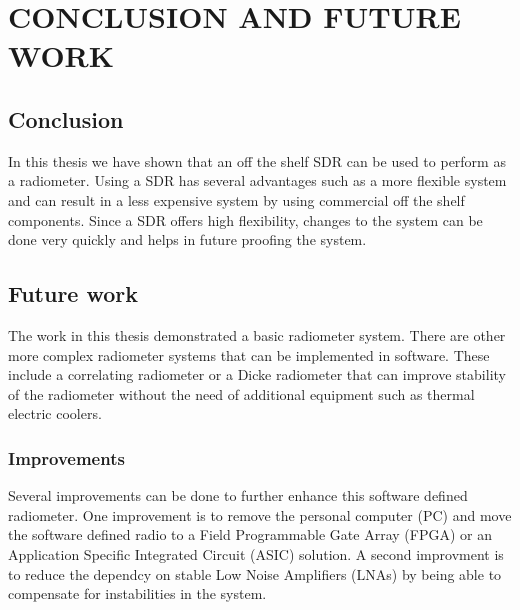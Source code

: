 
\chapter{CONCLUSION AND FUTURE WORK} \label{ch:conclusion}

\section{Conclusion}
In this thesis we have shown that an off the shelf SDR can be used to perform as a radiometer.  Using a SDR has several advantages such as a more flexible system and can result in a less expensive system by using commercial off the shelf components.  Since a SDR offers high flexibility, changes to the system can be done very quickly and helps in future proofing the system.

\section{Future work}\label{Futurework}

The work in this thesis demonstrated a basic radiometer system.  There are other more complex radiometer systems that can be implemented in software. These include a correlating radiometer or a Dicke radiometer that can improve stability of the radiometer without the need of additional equipment such as thermal electric coolers.   


\subsection{Improvements}
Several improvements can be done to further enhance this software defined radiometer.  One improvement is to remove the personal computer (PC) and move the software defined radio to a Field Programmable Gate Array (FPGA) or an Application Specific Integrated Circuit (ASIC) solution.  A second improvment is to reduce the dependcy on stable Low Noise Amplifiers (LNAs) by being able to compensate for instabilities in the system.  

